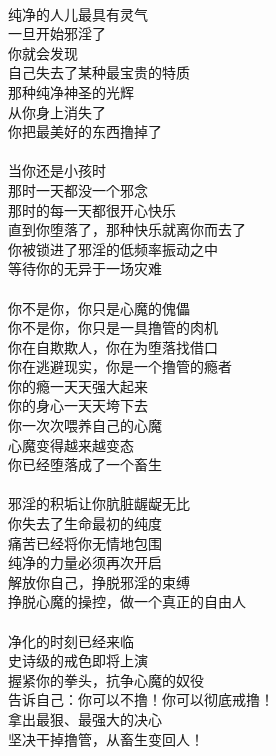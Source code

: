 \begin{poem}[最后的救赎]
    \begin{multicols}{2}
        \centering~\\
        纯净的人儿最具有灵气 \\ 一旦开始邪淫了 \\ 你就会发现 \\ 自己失去了某种最宝贵的特质 \\ 那种纯净神圣的光辉 \\ 从你身上消失了 \\ 你把最美好的东西撸掉了 \\~\\
        当你还是小孩时 \\ 那时一天都没一个邪念 \\ 那时的每一天都很开心快乐 \\ 直到你堕落了，那种快乐就离你而去了 \\ 你被锁进了邪淫的低频率振动之中 \\ 等待你的无异于一场灾难 \\~\\
        你不是你，你只是心魔的傀儡 \\ 你不是你，你只是一具撸管的肉机 \\ 你在自欺欺人，你在为堕落找借口 \\ 你在逃避现实，你是一个撸管的瘾者 \\ 你的瘾一天天强大起来 \\ 你的身心一天天垮下去 \\ 你一次次喂养自己的心魔 \\ 心魔变得越来越变态 \\ 你已经堕落成了一个畜生 \\~\\
        邪淫的积垢让你肮脏龌龊无比 \\ 你失去了生命最初的纯度 \\ 痛苦已经将你无情地包围 \\ 纯净的力量必须再次开启 \\ 解放你自己，挣脱邪淫的束缚 \\ 挣脱心魔的操控，做一个真正的自由人 \\~\\
        净化的时刻已经来临 \\ 史诗级的戒色即将上演 \\ 握紧你的拳头，抗争心魔的奴役 \\ 告诉自己：你可以不撸！你可以彻底戒撸！ \\ 拿出最狠、最强大的决心 \\ 坚决干掉撸管，从畜生变回人！
    \end{multicols}
\end{poem}

